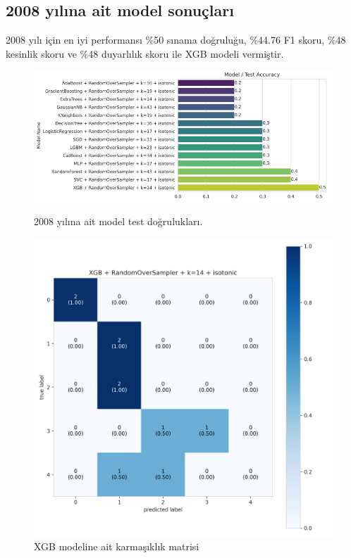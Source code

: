 \subsection{2008 yılına ait model sonuçları}
2008 yılı için en iyi performansı \%50 sınama doğruluğu,  \%44.76 F1 skoru, \%48 kesinlik skoru ve \%48 duyarlılık skoru ile XGB modeli vermiştir.

\begin{figure}[ht]
\centering
\begin{minipage}[b]{0.6\textwidth}
    \centering
    \includegraphics[width=\textwidth]{2008.png}
    \caption{2008 yılına ait model test doğrulukları.}
    \label{fig:resim1}
\end{minipage}
\hfill
\begin{minipage}[b]{0.6\textwidth}
    \centering
    \includegraphics[width=\textwidth]{2008_cm.png}
    \caption{XGB modeline ait karmaşıklık matrisi}
    \label{fig:resim2}
\end{minipage}
\end{figure}

